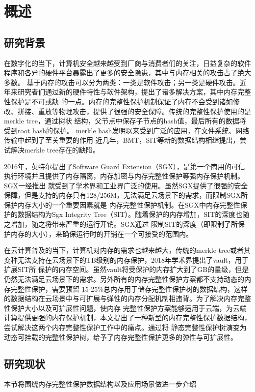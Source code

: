
\chapter{概述}

\section{研究背景}
在数字化的当下，计算机安全越来越受到厂商与消费者们的关注，日益复杂的软件程序和各异的硬件平台暴露出了更多的安全隐患，其中与内存相关的攻击占了绝大多数。
基于内存的攻击可以分为两类：一类是软件攻击；另一类是硬件攻击。近年来研究者们通过新的硬件特性与软件架构，提出了诸多解决方案，其中内存完整性保护是不可或缺
的一点。内存的完整性保护机制保证了内存不会受到诸如修改、拼接、重放等物理攻击，提供了很强的安全保障。传统的完整性保护使用的是merkle tree，通过树状
结构，父节点中保存子节点的hash值，最后所有的数据将受到root hash的保护。 merkle hash发明以来受到广泛的应用，在文件系统、网络传输中起到了至关重要的作用
近几年，BMT，SIT等新的数据结构相继提出，尝试解决merkle tree存在的缺陷。

2016年，英特尔提出了Software Guard Extension（SGX），是第一个商用的可信执行环境并且提供了内存隔离，内存加密与内存完整性保护等强内存保护机制。SGX一经推出
就受到了学术界和工业界广泛的使用。虽然SGX提供了很强的安全保障，但是支持的内存只有128/256M，无法满足云场景下的需求，而限制SGX所保护内存大小的一个重要因素就是
内存完整性保护机制。在SGX中内存完整性保护的数据结构为Sgx Integrity Tree（SIT）。随着保护的内存增加，SIT的深度也随之增加，随之将带来严重的运行开销。SGX通过
限制SIT的深度（即限制了所保护内存的大小），来确保运行时的开销在一个可接受的范围内。 

在云计算普及的当下，计算机对内存的需求也越来越大，传统的merkle tree或者其变种无法支持在云场景下的TB级别的内存保护，2018年学术界提出了vault，用于扩展SIT所
保护的内存空间。虽然vault将受保护的内存扩大到了GB的量级，但是仍然无法满足云场景下的需求。另外所有的内存完整性保护方案都不支持动态的内存完整性保护，需要预留
15-25\%总内存用于储存完整性保护树的数据结构，这样的数据结构在云场景中与可扩展与弹性的内存分配机制相违背。为了解决内存完整性保护大小以及可扩展性问题，使内存
完整性保护方案能够适用于云端，为云端计算提供更强的内存保护机制，本文提出了一种新型的内存完整性保护数据结构，尝试解决这两个内存完整性保护工作中的痛点。通过将
静态完整性保护树演变为动态可挂载的完整性保护树，给予了内存完整性保护更多的弹性与可扩展性。

\section{研究现状}
本节将围绕内存完整性保护数据结构以及应用场景做进一步介绍

